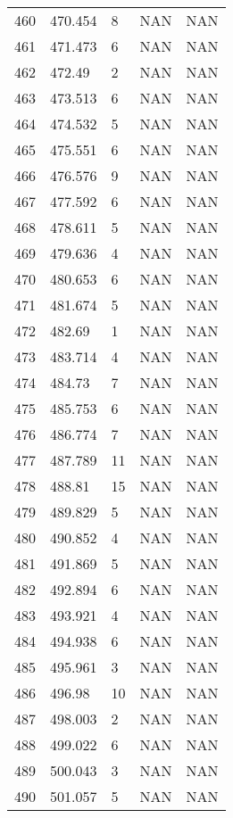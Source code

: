 \documentclass{article}
\begin{document}
\begin{longtable}{@{}lllll@{}}
				460 & 470.454 & 8     & NAN   & NAN   \\
				461 & 471.473 & 6     & NAN   & NAN   \\
				462 & 472.49  & 2     & NAN   & NAN   \\
				463 & 473.513 & 6     & NAN   & NAN   \\
				464 & 474.532 & 5     & NAN   & NAN   \\
				465 & 475.551 & 6     & NAN   & NAN   \\
				466 & 476.576 & 9     & NAN   & NAN   \\
				467 & 477.592 & 6     & NAN   & NAN   \\
				468 & 478.611 & 5     & NAN   & NAN   \\
				469 & 479.636 & 4     & NAN   & NAN   \\
				470 & 480.653 & 6     & NAN   & NAN   \\
				471 & 481.674 & 5     & NAN   & NAN   \\
				472 & 482.69  & 1     & NAN   & NAN   \\
				473 & 483.714 & 4     & NAN   & NAN   \\
				474 & 484.73  & 7     & NAN   & NAN   \\
				475 & 485.753 & 6     & NAN   & NAN   \\
				476 & 486.774 & 7     & NAN   & NAN   \\
				477 & 487.789 & 11    & NAN   & NAN   \\
				478 & 488.81  & 15    & NAN   & NAN   \\
				479 & 489.829 & 5     & NAN   & NAN   \\
				480 & 490.852 & 4     & NAN   & NAN   \\
				481 & 491.869 & 5     & NAN   & NAN   \\
				482 & 492.894 & 6     & NAN   & NAN   \\
				483 & 493.921 & 4     & NAN   & NAN   \\
				484 & 494.938 & 6     & NAN   & NAN   \\
				485 & 495.961 & 3     & NAN   & NAN   \\
				486 & 496.98  & 10    & NAN   & NAN   \\
				487 & 498.003 & 2     & NAN   & NAN   \\
				488 & 499.022 & 6     & NAN   & NAN   \\
				489 & 500.043 & 3     & NAN   & NAN   \\
				490 & 501.057 & 5     & NAN   & NAN   \\

\end{longtable}
\end{document}

